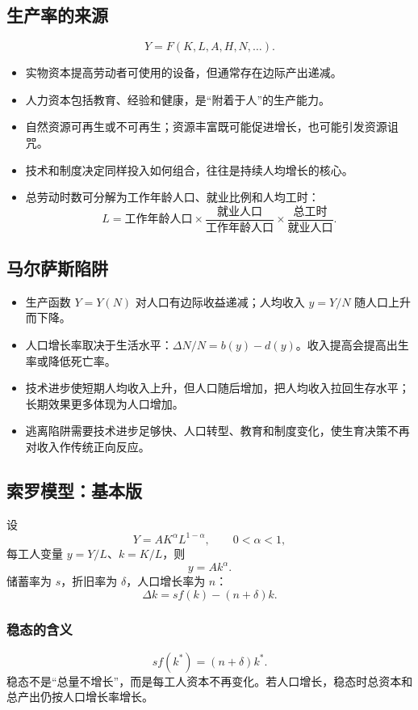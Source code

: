 \documentclass[UTF8,11pt,a4paper]{ctexart}
\begin{document}
\subsection{生产率的来源}
\[
Y=F(K,L,A,H,N,\ldots).
\]
\begin{itemize}
  \item 实物资本提高劳动者可使用的设备，但通常存在边际产出递减。
  \item 人力资本包括教育、经验和健康，是“附着于人”的生产能力。
  \item 自然资源可再生或不可再生；资源丰富既可能促进增长，也可能引发资源诅咒。
  \item 技术和制度决定同样投入如何组合，往往是持续人均增长的核心。
  \item 总劳动时数可分解为工作年龄人口、就业比例和人均工时：
  \[
  L=\text{工作年龄人口}\times\frac{\text{就业人口}}{\text{工作年龄人口}}\times\frac{\text{总工时}}{\text{就业人口}}.
  \]
\end{itemize}

\subsection{马尔萨斯陷阱}
\begin{itemize}
  \item 生产函数 $Y=Y(N)$ 对人口有边际收益递减；人均收入 $y=Y/N$ 随人口上升而下降。
  \item 人口增长率取决于生活水平：$\Delta N/N=b(y)-d(y)$。收入提高会提高出生率或降低死亡率。
  \item 技术进步使短期人均收入上升，但人口随后增加，把人均收入拉回生存水平；长期效果更多体现为人口增加。
  \item 逃离陷阱需要技术进步足够快、人口转型、教育和制度变化，使生育决策不再对收入作传统正向反应。
\end{itemize}

\subsection{索罗模型：基本版}
设
\[
Y=AK^\alpha L^{1-\alpha},\qquad 0<\alpha<1,
\]
每工人变量 $y=Y/L$、$k=K/L$，则
\[
y=Ak^\alpha.
\]
储蓄率为 $s$，折旧率为 $\delta$，人口增长率为 $n$：
\[
\Delta k=s f(k)-(n+\delta)k.
\]

\subsubsection{稳态的含义}
\[
sf(k^*)=(n+\delta)k^*.
\]
稳态不是“总量不增长”，而是每工人资本不再变化。若人口增长，稳态时总资本和总产出仍按人口增长率增长。
\end{document}
